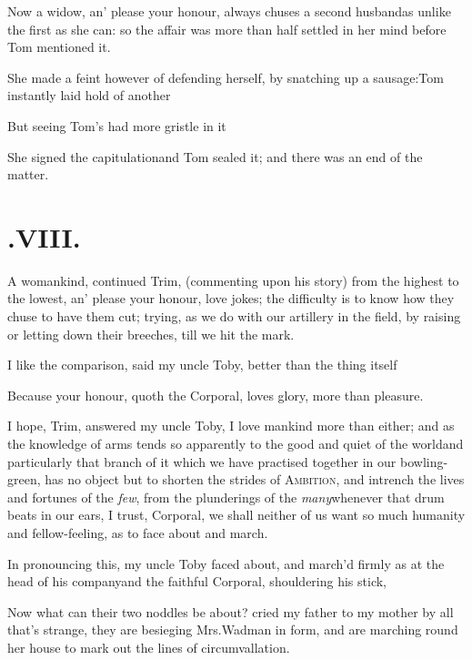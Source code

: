 \documentclass{article}
\begin{document}
\tsh Now a widow, an’ please your honour, always chuses a second husband\pb as
unlike the first as she can: so the affair was more than half settled in her mind
before Tom mentioned it.

She made a feint however of defending herself, by snatching up a
sausage:\break\tsh Tom instantly laid hold of
another\tsh

But seeing Tom’s had more gristle in
it\tsh

She signed the capitulation\tsh and Tom sealed
it; and there was an end of the matter.

\newpage
\section{.\enspace VIII.}

\lettrine{A}{} womankind, continued Trim,
(commenting upon his story) from the highest to the lowest,
an’ please your honour, love jokes; the difficulty is to know
how they chuse to have them cut; 
trying, as we do with our artillery in the field, by raising or
letting down their breeches, till we hit the
mark.\tsh

\tsh I like the comparison, said my uncle Toby,
better than the thing it\-self\tsh

\tsh Because your honour, quoth the Corporal, loves
glory, more than pleasure.

\newpage
I hope, Trim, answered my uncle Toby, I love mankind more than either; and as the
knowledge of arms tends so apparently to the good and quiet of the world\tsh and
particularly that branch of it which we have practised together in our
bowling-green, has no object but to shorten the strides of \textsc{Ambition}, and
intrench the lives and fortunes of the \textit{few}, from the plunderings of the
\textit{many}\break\tsh whenever that drum beats in our ears, I trust, Corporal, we shall
neither of us want so much humanity and fellow-feeling, as to face about and march.

In pronouncing this, my uncle Toby faced about, and march’d firmly as at the head of
his company\tsh and the faithful Corporal, shouldering his stick,\pb
{}

\tsh Now what can their two noddles be about? cried my father to my mother\break
\null\tsh by all that’s strange, they are besieging Mrs.\@ Wadman in form, and are
marching round her house to mark out the lines of circumvallation.
\end{document}
